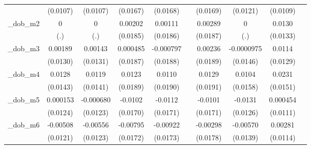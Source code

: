 \begin{table}[htbp]
\begin{tabular}{l*{9}{c}}
            &    (0.0107)         &    (0.0107)         &    (0.0167)         &    (0.0168)         &                     &    (0.0169)         &    (0.0121)         &    (0.0109)         &                     \\
[1em]
\_dob\_m2     &           0         &           0         &     0.00202         &     0.00111         &                     &     0.00289         &           0         &      0.0130         &                     \\
            &         (.)         &         (.)         &    (0.0185)         &    (0.0186)         &                     &    (0.0187)         &         (.)         &    (0.0133)         &                     \\
[1em]
\_dob\_m3     &     0.00189         &     0.00143         &    0.000485         &   -0.000797         &                     &     0.00236         &  -0.0000975         &      0.0114         &                     \\
            &    (0.0130)         &    (0.0131)         &    (0.0187)         &    (0.0188)         &                     &    (0.0189)         &    (0.0146)         &    (0.0129)         &                     \\
[1em]
\_dob\_m4     &      0.0128         &      0.0119         &      0.0123         &      0.0110         &                     &      0.0129         &      0.0104         &      0.0231         &                     \\
            &    (0.0143)         &    (0.0141)         &    (0.0189)         &    (0.0190)         &                     &    (0.0191)         &    (0.0158)         &    (0.0151)         &                     \\
[1em]
\_dob\_m5     &    0.000153         &   -0.000680         &     -0.0102         &     -0.0112         &                     &     -0.0101         &     -0.0131         &    0.000454         &                     \\
            &    (0.0124)         &    (0.0123)         &    (0.0170)         &    (0.0171)         &                     &    (0.0171)         &    (0.0126)         &    (0.0111)         &                     \\
[1em]
\_dob\_m6     &    -0.00508         &    -0.00556         &    -0.00795         &    -0.00922         &                     &    -0.00298         &    -0.00570         &     0.00281         &                     \\
            &    (0.0121)         &    (0.0123)         &    (0.0172)         &    (0.0173)         &                     &    (0.0178)         &    (0.0139)         &    (0.0114)         &                     \\

\end{tabular}
\end{table}
